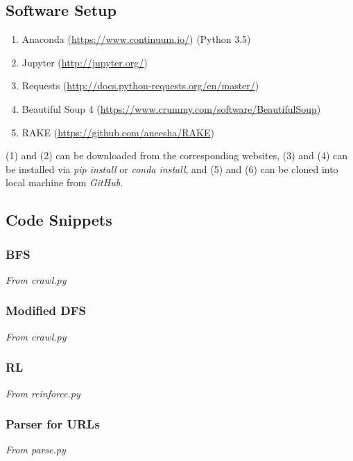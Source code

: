 \documentclass{article}
\begin{document}
\subsection{Software Setup}
\begin{enumerate}
	\item Anaconda (\url{https://www.continuum.io/}) (Python 3.5)
	\item Jupyter (\url{http://jupyter.org/})
	\item Requests (\url{http://docs.python-requests.org/en/master/})
	\item Beautiful Soup 4 (\url{https://www.crummy.com/software/BeautifulSoup})
	\item RAKE (\url{https://github.com/aneesha/RAKE})
\end{enumerate}
(1) and (2) can be downloaded from the corresponding websites, (3) and (4) can be installed via \textit{pip install} or \textit{conda install}, and (5) and (6) can be cloned into local machine from \textit{GitHub}.
\newpage

\subsection{Code Snippets}

\subsubsection{BFS}
\label{sec:6.2.1}
\textit{From crawl.py}

\newpage

\subsubsection{Modified DFS}
\label{sec:6.2.2}
\textit{From crawl.py}

\newpage

\subsubsection{RL}
\textit{From reinforce.py}


\subsubsection{Parser for URLs}
\textit{From parse.py}

\newpage
\end{document}
